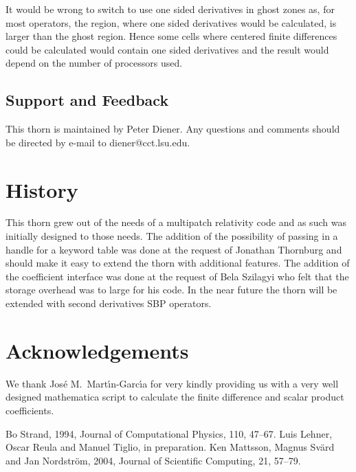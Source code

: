 It would be wrong to switch to use one sided derivatives in ghost zones as,
for most operators, the region, where one sided derivatives would be
calculated, is larger than the ghost region. Hence some cells where centered
finite differences could be calculated would contain one sided derivatives and
the result would depend on the number of processors used.

\subsection{Support and Feedback}
This thorn is maintained by Peter Diener. Any questions and comments should
be directed by e-mail to diener@cct.lsu.edu.

\section{History}
This thorn grew out of the needs of a multipatch relativity code and as
such was initially designed to those needs. The addition of the possibility
of passing in a handle for a keyword table was done at the request of
Jonathan Thornburg and should make it easy to extend the thorn with
additional features. The addition of the coefficient interface was done
at the request of Bela Szilagyi who felt that the storage overhead was
to large for his code. In the near future the thorn will be extended with
second derivatives SBP operators.

%

\section{Acknowledgements}
We thank Jos\'{e} M.\ Mart\'{\i}n-Garc\'{\i}a for very kindly providing us
with a very well designed mathematica script to calculate the finite
difference and scalar product coefficients.

\begin{thebibliography}{9}
 Bo Strand, 1994, Journal of Computational Physics, 110,
47--67.
 Luis Lehner, Oscar Reula and Manuel Tiglio, in preparation.
 Ken Mattsson, Magnus Sv\"{a}rd and Jan Nordstr\"{o}m, 2004,
Journal of Scientific Computing, 21, 57--79.

\end{thebibliography}


